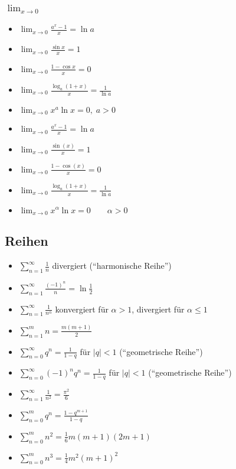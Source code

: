 \subsubsection{$\lim_{x \to 0}$}
\begin{itemize}[leftmargin=*]
	\item $\lim_{x \to 0} \frac{a^x - 1}{x} = \ln a$
	\item $\lim_{x \to 0} \frac{\sin x}{x} = 1$
	\item $\lim_{x \to 0} \frac{1 - \cos x}{x} = 0$
	\item $\lim_{x \to 0} \frac{\log_a (1 + x)}{x} = \frac{1}{\ln a}$
	\item $\lim_{x \to 0} x^a \ln x = 0, \; a  > 0$
	\item $\lim_{x \to 0} \frac{a^x-1}{x} = \ln a$ 
	\item $\lim_{x \to 0} \frac{\sin(x)}{x} = 1$ 
	\item $\lim_{x \to 0} \frac{1-\cos(x)}{x} = 0 \quad$ 
	\item $\lim_{x \to 0} \frac{\log_a(1+x)}{x} = \frac{1}{\ln a}$
	\item $\lim_{x \to 0} x^\alpha \ln x = 0 \qquad \alpha > 0$
\end{itemize}

\subsection{Reihen}
\begin{itemize}[leftmargin=*]
	\item $\sum_{n=1}^\infty \frac{1}{n}$ divergiert (``harmonische Reihe'')
	\item $\sum_{n=1}^\infty \frac{(-1)^n}{n} = \ln \frac{1}{2}$
	\item $\sum_{n=1}^\infty \frac{1}{n^\alpha}$ konvergiert für $\alpha > 1$,
	divergiert für $\alpha \leq 1$
	\item $\sum_{n=1}^m n = \frac{m(m+1)}{2}$
	\item $\sum_{n=0}^\infty q^n = \frac{1}{1-q}$ für $|q| < 1$ (``geometrische
	Reihe'')
	\item $\sum_{n=0}^\infty (-1)^n q^n = \frac{1}{1-q}$ für $|q| < 1$ (``geometrische
	Reihe'')
	\item $\sum_{n=1}^\infty \frac{1}{n^2} = \frac{\pi^2}{6}$
	\item $\sum_{n=0}^m q^n = \frac{1-q^{m+1}}{1-q}$ 
	\item  $\sum_{n=0}^m n^2 = \frac{1}{6}m(m+1)(2m+1)$
	\item  $\sum_{n=0}^m n^3 = \frac{1}{4}m^2(m+1)^2$
\end{itemize}


